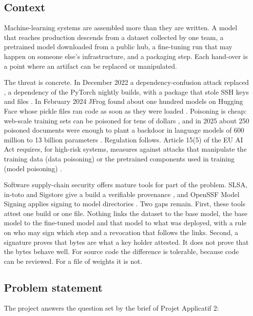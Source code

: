 
\subsection{Context}
Machine-learning systems are assembled more than they are written. A model that reaches production descends
from a dataset collected by one team, a pretrained model downloaded from a public hub, a fine-tuning run that may
happen on someone else's infrastructure, and a packaging step. Each hand-over is a point where an artifact can be
replaced or manipulated.

The threat is concrete. In December 2022 a dependency-confusion attack replaced , a dependency
of the PyTorch nightly builds, with a package that stole SSH keys and files \cite{pytorch2022}. In February 2024
JFrog found about one hundred models on Hugging Face whose pickle files ran code as soon as they were loaded
\cite{jfrog2024}. Poisoning is cheap: web-scale training sets can be poisoned for tens of dollars
\cite{carlini2024}, and in 2025 about 250 poisoned documents were enough to plant a backdoor in language models
of 600 million to 13 billion parameters \cite{souly2025}. Regulation follows. Article 15(5) of the EU AI Act
requires, for high-risk systems, measures against attacks that manipulate the training data (data poisoning) or
the pretrained components used in training (model poisoning) \cite{aiact2024}.

Software supply-chain security offers mature tools for part of the problem. SLSA, in-toto and Sigstore give a
build a verifiable provenance \cite{slsa11,intoto2019,sigstore2022}, and OpenSSF Model Signing applies signing to
model directories \cite{oms2025}. Two gaps remain. First, these tools attest one build or one file. Nothing
links the dataset to the base model, the base model to the fine-tuned model and that model to what was deployed,
with a rule on who may sign which step and a revocation that follows the links. Second, a signature proves that
bytes are what a key holder attested. It does not prove that the bytes behave well. For source code the
difference is tolerable, because code can be reviewed. For a file of weights it is not.

\subsection{Problem statement}
The project answers the question set by the brief of Projet Applicatif 2:

